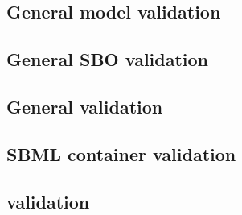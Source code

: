 \begin{sbmlenum}

\end{sbmlenum} \subsection*{General model validation} \begin{sbmlenum}


\end{sbmlenum} \subsection*{General SBO validation} \begin{sbmlenum}


\end{sbmlenum} \subsection*{General  validation} \begin{sbmlenum}


\end{sbmlenum} \subsection*{SBML container validation} \begin{sbmlenum}


\end{sbmlenum} \subsection*{ validation} \begin{sbmlenum}


\end{sbmlenum}
